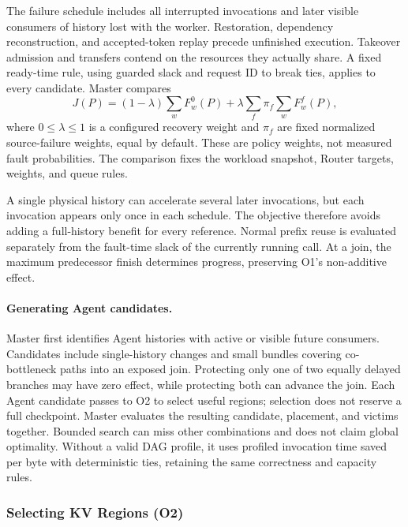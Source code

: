 The failure schedule includes all interrupted invocations and later
visible consumers of history lost with the worker. Restoration,
dependency reconstruction, and accepted-token replay precede unfinished
execution. Takeover admission and transfers contend on the resources
they actually share. A fixed ready-time rule, using guarded slack and
request ID to break ties, applies to every candidate. Master compares
\begin{equation}
 J(P)=(1-\lambda)\sum_w F_w^0(P)
       +\lambda\sum_f\pi_f\sum_w F_w^f(P),
 \label{eq:objective}
\end{equation}
where $0\le\lambda\le1$ is a configured recovery weight and $\pi_f$ are
fixed normalized source-failure weights, equal by default. These are
policy weights, not measured fault probabilities. The comparison fixes
the workload snapshot, Router targets, weights, and queue rules.

A single physical history can accelerate several later invocations,
but each invocation appears only once in each schedule. The objective
therefore avoids adding a full-history benefit for every reference.
Normal prefix reuse is evaluated separately from the fault-time slack
of the currently running call. At a join, the maximum predecessor
finish determines progress, preserving O1's non-additive effect.

\paragraph{Generating Agent candidates.}
Master first identifies Agent histories with active or visible future
consumers. Candidates include single-history changes and small bundles
covering co-bottleneck paths into an exposed join. Protecting only one
of two equally delayed branches may have zero effect, while protecting
both can advance the join. Each Agent candidate passes to O2 to
select useful regions; selection does not reserve a full checkpoint.
Master evaluates the resulting candidate, placement, and victims
together. Bounded search can miss other combinations and does not claim
global optimality. Without a valid DAG profile, it uses profiled
invocation time saved per byte with deterministic ties, retaining the
same correctness and capacity rules.

\subsubsection{Selecting KV Regions (O2)}
\label{sec:region-selection}

